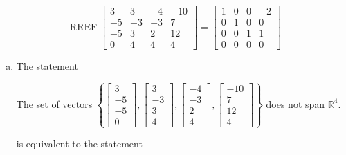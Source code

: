 \begin{exerciseAnswer} 


\[\operatorname{RREF} \left[\begin{array}{cccc}
3 & 3 & -4 & -10 \\
-5 & -3 & -3 & 7 \\
-5 & 3 & 2 & 12 \\
0 & 4 & 4 & 4
\end{array}\right] = \left[\begin{array}{cccc}
1 & 0 & 0 & -2 \\
0 & 1 & 0 & 0 \\
0 & 0 & 1 & 1 \\
0 & 0 & 0 & 0
\end{array}\right] \]


\begin{enumerate}[(a)]
\item The statement 
\begin{center}\begin{minipage}{0.8\textwidth}
 The set of vectors \( \left\{ \left[\begin{array}{c}
3 \\
-5 \\
-5 \\
0
\end{array}\right] , \left[\begin{array}{c}
3 \\
-3 \\
3 \\
4
\end{array}\right] , \left[\begin{array}{c}
-4 \\
-3 \\
2 \\
4
\end{array}\right] , \left[\begin{array}{c}
-10 \\
7 \\
12 \\
4
\end{array}\right] \right\} \) does not span \(\mathbb{R}^4\). 
\end{minipage}\end{center}
     is equivalent to the statement 
\begin{center}\begin{minipage}{0.8\textwidth}
 The vector equation \( x_{1} \left[\begin{array}{c}
3 \\
-5 \\

\end{array}
\end{minipage}
\end{center}
\end{enumerate}
\end{exerciseAnswer}
